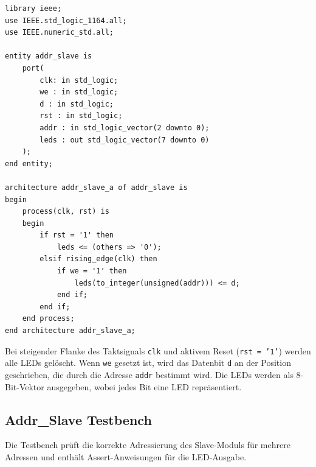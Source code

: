 \begin{verbatim}
library ieee;
use IEEE.std_logic_1164.all;
use IEEE.numeric_std.all;

entity addr_slave is
    port(
        clk: in std_logic;
        we : in std_logic;
        d : in std_logic;
        rst : in std_logic;
        addr : in std_logic_vector(2 downto 0);
        leds : out std_logic_vector(7 downto 0)
    );
end entity;

architecture addr_slave_a of addr_slave is
begin
    process(clk, rst) is
    begin
        if rst = '1' then
            leds <= (others => '0');
        elsif rising_edge(clk) then
            if we = '1' then
                leds(to_integer(unsigned(addr))) <= d;
            end if;    
        end if;
    end process;
end architecture addr_slave_a;
\end{verbatim}

Bei steigender Flanke des Taktsignals \texttt{clk} und aktivem Reset (\texttt{rst = '1'}) werden alle LEDs gelöscht. Wenn \texttt{we} gesetzt ist, wird das Datenbit \texttt{d} an der Position geschrieben, die durch die Adresse \texttt{addr} bestimmt wird. Die LEDs werden als 8-Bit-Vektor ausgegeben, wobei jedes Bit eine LED repräsentiert.

\newpage
\subsection{Addr\_Slave Testbench}
Die Testbench prüft die korrekte Adressierung des Slave-Moduls für mehrere Adressen und enthält Assert-Anweisungen für die LED-Ausgabe.


